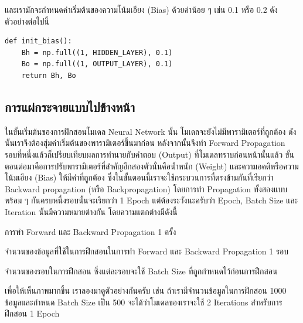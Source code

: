 \noindent และเรามักจะกำหนดค่าเริ่มต้นของความโน้มเอียง (Bias) ด้วยค่าน้อย ๆ เช่น 0.1 หรือ 0.2 ดังตัวอย่างต่อไปนี้

\begin{lstlisting}[style=MyPython]
def init_bias():
    Bh = np.full((1, HIDDEN_LAYER), 0.1)
    Bo = np.full((1, OUTPUT_LAYER), 0.1)
    return Bh, Bo
\end{lstlisting}

\subsection{การแผ่กระจายแบบไปข้างหน้า}
\label{ssec:forward_prop}

ในขั้นเริ่มต้นของการฝึกสอนโมเดล Neural Network นั้น โมเดลจะยังไม่มีพารามิเตอร์ที่ถูกต้อง ดังนั้นเราจึงต้องสุ่มค่าเริ่มต้นของพารามิเตอร์ขึ้นมาก่อน
หลังจากนั้นจึงทำ Forward Propagation รอบที่หนึ่งแล้วก็เปรียบเทียบผลการทำนายกับคำตอบ (Output) ที่โมเดลทราบก่อนหน้านั้นแล้ว
ขั้นตอนต่อมาคือการปรับพารามิเตอร์ที่สำคัญอีกสองตัวนั่นคือน้ำหนัก (Weight) และความอคติหรือความโน้มเอียง (Bias) ให้มีค่าที่ถูกต้อง 
ซึ่งในขั้นตอนนี้เราจะใช้กระบวนการที่ตรงข้ามกันที่เรียกว่า Backward propagation (หรือ Backpropagation) โดยการทำ Propagation 
ทั้งสองแบบพร้อม ๆ กันครบหนึ่งรอบนั้นจะเรียกว่า 1 Epoch แต่ต้องระวังนะครับว่า Epoch, Batch Size และ Iteration นั้นมีความหมายต่างกัน 
โดยความแตกต่างมีดังนี้

\begin{description}[font=$\bullet$~\normalfont\scshape\bfseries\color{red!50!black}]
    \item[1 Epoch] การทำ Forward และ Backward Propagation 1 ครั้ง
    
    \item[Batch Size] จำนวนของข้อมูลที่ใช้ในการฝึกสอนในการทำ Forward และ Backward Propagation 1 รอบ
    
    \item[Iteration] จำนวนของรอบในการฝึกสอน ซึ่งแต่ละรอบจะใช้ Batch Size ที่ถูกกำหนดไว้ก่อนการฝึกสอน
\end{description}

เพื่อให้เห็นภาพมากขึ้น เราลองมาดูตัวอย่างกันครับ เช่น ถ้าเรามีจำนวนข้อมูลในการฝึกสอน 1000 ข้อมูลและกำหนด Batch Size เป็น 500 
จะได้ว่าโมเดลของเราจะใช้ 2 Iterations สำหรับการฝึกสอน 1 Epoch

